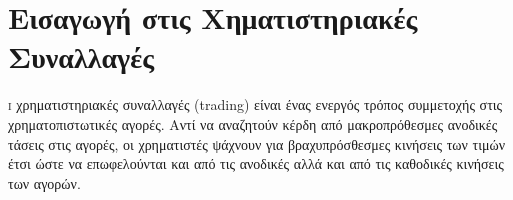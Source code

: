 


\section{Εισαγωγή στις Χηματιστηριακές Συναλλαγές}

\lettrine[findent=2pt]{}{ι} χρηματιστηριακές συναλλαγές (trading) είναι ένας ενεργός τρόπος συμμετοχής στις χρηματοπιστωτικές αγορές. Αντί να αναζητούν κέρδη από μακροπρόθεσμες ανοδικές τάσεις στις αγορές, οι χρηματιστές ψάχνουν για βραχυπρόσθεσμες κινήσεις των τιμών έτσι ώστε να επωφελούνται και από τις ανοδικές αλλά και από τις καθοδικές κινήσεις των αγορών.

